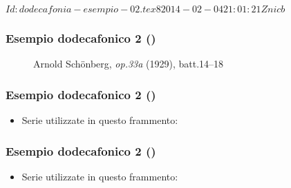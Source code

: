 %
%
\svnInfo $Id: dodecafonia-esempio-02.tex 8 2014-02-04 21:01:21Z nicb $

\setcounter{ms}{0}
\begin{frame}
    \frametitle{Esempio dodecafonico 2 ()}

    \begin{center}
        \begin{figure}
            \caption{Arnold Sch\"onberg, \emph{op.33a} (1929), batt.14--18}
        \end{figure}
    \end{center}

\end{frame}

\begin{frame}
    \frametitle{Esempio dodecafonico 2 ()}

    \begin{itemize}

        \item Serie utilizzate in questo frammento:

            \begin{center}
            \end{center}

    \end{itemize}

\end{frame}

\begin{frame}
    \frametitle{Esempio dodecafonico 2 ()}

    \begin{itemize}

        \item Serie utilizzate in questo frammento:

            \begin{center}
            \end{center}

    \end{itemize}

\end{frame}
